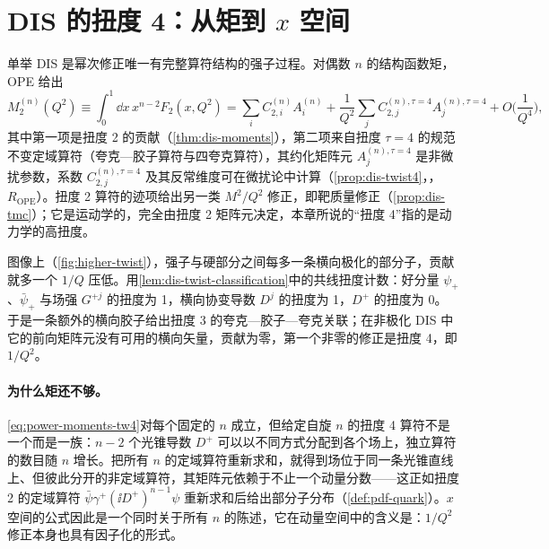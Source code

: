 \section{DIS 的扭度 4：从矩到 \texorpdfstring{$x$}{x} 空间}\label{sec:power-twist4}

单举 DIS 是幂次修正唯一有完整算符结构的强子过程。对偶数 $n$ 的结构函数矩，OPE 给出
\begin{equation}\label{eq:power-moments-tw4}
M_2^{(n)}(Q^2)\equiv\int_0^1\!\dd x\,x^{n-2}F_2(x,Q^2)
=\sum_iC^{(n)}_{2,i}A^{(n)}_i+\frac1{Q^2}\sum_jC^{(n),\tau=4}_{2,j}A^{(n),\tau=4}_j+O\Big(\frac{1}{Q^4}\Big),
\end{equation}
其中第一项是扭度 2 的贡献（\cref{thm:dis-moments}），第二项来自扭度 $\tau=4$ 的规范不变定域算符（夸克—胶子算符与四夸克算符），其约化矩阵元 $A^{(n),\tau=4}_j$ 是非微扰参数，系数 $C^{(n),\tau=4}_{2,j}$ 及其反常维度可在微扰论中计算（\cref{prop:dis-twist4}，\tagR，$R_{\mathrm{OPE}}$）。扭度 2 算符的迹项给出另一类 $M^2/Q^2$ 修正，即靶质量修正（\cref{prop:dis-tmc}）；它是运动学的，完全由扭度 2 矩阵元决定，本章所说的“扭度 4”指的是动力学的高扭度。

图像上（\cref{fig:higher-twist}），强子与硬部分之间每多一条横向极化的部分子，贡献就多一个 $1/Q$ 压低。用\cref{lem:dis-twist-classification}中的共线扭度计数：好分量 $\psi_+$、$\bar\psi_+$ 与场强 $G^{+j}$ 的扭度为 1，横向协变导数 $D^j$ 的扭度为 1，$D^+$ 的扭度为 0。于是一条额外的横向胶子给出扭度 3 的夸克—胶子—夸克关联；在非极化 DIS 中它的前向矩阵元没有可用的横向矢量，贡献为零，第一个非零的修正是扭度 4，即 $1/Q^2$。

\paragraph{为什么矩还不够。}
\cref{eq:power-moments-tw4}对每个固定的 $n$ 成立，但给定自旋 $n$ 的扭度 4 算符不是一个而是一族：$n-2$ 个光锥导数 $D^+$ 可以以不同方式分配到各个场上，独立算符的数目随 $n$ 增长。把所有 $n$ 的定域算符重新求和，就得到场位于同一条光锥直线上、但彼此分开的非定域算符，其矩阵元依赖于不止一个动量分数——这正如扭度 2 的定域算符 $\bar\psi\gamma^+(\ii D^+)^{n-1}\psi$ 重新求和后给出部分子分布（\cref{def:pdf-quark}）。$x$ 空间的公式因此是一个同时关于所有 $n$ 的陈述，它在动量空间中的含义是：$1/Q^2$ 修正本身也具有因子化的形式。

